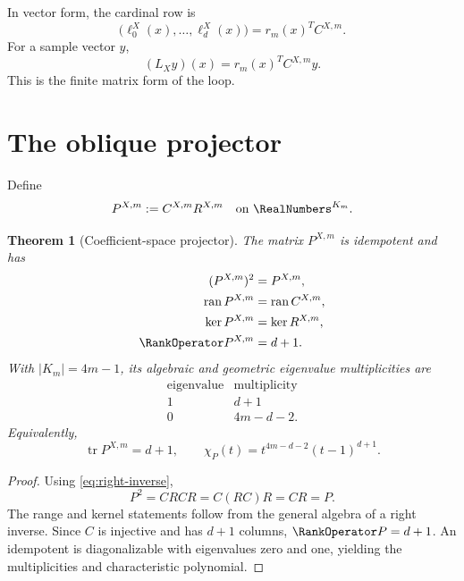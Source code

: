 \documentclass[11pt,oneside]{book}
\newtheorem{theorem}{Theorem}[chapter]
\theoremstyle{definition}
\theoremstyle{remark}
\DeclareMathOperator{\ran}{ran}
\DeclareMathOperator{\tr}{tr}
\begin{document}
In vector form, the cardinal row is
\begin{equation}
 \bigl(\ell_0^X(x),\ldots,\ell_d^X(x)\bigr)
 =r_m(x)^TC^{X,m}.
 \label{eq:cardinal-row-factorization}
\end{equation}
For a sample vector \(y\),
\begin{equation}
 (L_Xy)(x)=r_m(x)^TC^{X,m}y.
 \label{eq:sample-factorization}
\end{equation}
This is the finite matrix form of the loop.

\section{The oblique projector}
Define
\begin{equation}
 P^{X,m}:=C^{X,m}R^{X,m}
 \quad\text{on }\RealNumbers^{K_m}.
 \label{eq:coefficient-projector}
\end{equation}

\begin{theorem}[Coefficient-space projector]
\label{thm:coefficient-projector}
The matrix \(P^{X,m}\) is idempotent and has
\begin{align}
 (P^{X,m})^2&=P^{X,m},\label{eq:P-idempotent}\\
 \ran P^{X,m}&=\ran C^{X,m},\label{eq:P-range}\\
 \ker P^{X,m}&=\ker R^{X,m},\label{eq:P-kernel}\\
 \RankOperator P^{X,m}&=d+1.\label{eq:P-rank}
\end{align}
With \(|K_m|=4m-1\), its algebraic and geometric eigenvalue multiplicities are
\begin{equation}
 \begin{array}{c|c}
 \text{eigenvalue}&\text{multiplicity}\\ \hline
 1&d+1\\
 0&4m-d-2.
 \end{array}
 \label{eq:P-spectrum}
\end{equation}
Equivalently,
\begin{equation}
 \tr P^{X,m}=d+1,
 \qquad
 \chi_P(t)=t^{4m-d-2}(t-1)^{d+1}.
 \label{eq:P-characteristic}
\end{equation}
\end{theorem}

\begin{proof}
Using \cref{eq:right-inverse},
\[
 P^2=CRCR=C(RC)R=CR=P.
\]
The range and kernel statements follow from the general algebra of a right inverse.  Since \(C\) is injective and has \(d+1\) columns, \(\RankOperator P=d+1\).  An idempotent is diagonalizable with eigenvalues zero and one, yielding the multiplicities and characteristic polynomial.
\end{proof}
\end{document}
